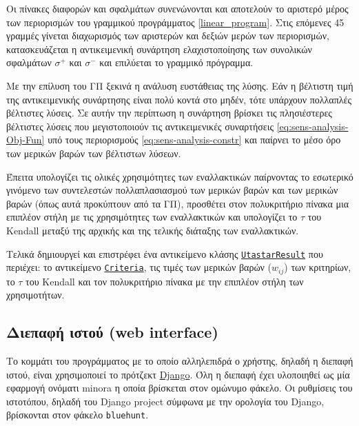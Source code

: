 \documentclass[11pt,a4paper,titlepage]{article}
\numberwithin{equation}{section}
\begin{document}
Οι πίνακες διαφορών και σφαλμάτων συνενώνονται και αποτελούν το αριστερό μέρος των περιορισμών του γραμμικού προγράμματος \eqref{linear_program}. Στις επόμενες 45 γραμμές γίνεται διαχωρισμός των αριστερών και δεξιών μερών των περιορισμών, κατασκευάζεται η αντικειμενική συνάρτηση ελαχιστοποίησης των συνολικών σφαλμάτων $ σ^{+} $ και $ σ^{-} $ και επιλύεται το γραμμικό πρόγραμμα.

Με την επίλυση του ΓΠ ξεκινά η ανάλυση ευστάθειας της λύσης. Εάν η βέλτιστη τιμή της αντικειμενικής συνάρτησης είναι πολύ κοντά στο μηδέν, τότε υπάρχουν πολλαπλές βέλτιστες λύσεις. Σε αυτήν την περίπτωση η συνάρτηση βρίσκει τις πλησιέστερες βέλτιστες λύσεις που μεγιστοποιούν τις αντικειμενικές συναρτήσεις \eqref{eq:sens-analysis-Obj-Fun} υπό τους περιορισμούς \eqref{eq:sens-analysis-constr} και παίρνει το μέσο όρο των μερικών βαρών των βέλτιστων λύσεων. 

Έπειτα υπολογίζει τις ολικές χρησιμότητες των εναλλακτικών παίρνοντας το εσωτερικό γινόμενο των συντελεστών πολλαπλασιασμού των μερικών βαρών και των μερικών βαρών (όπως αυτά προκύπτουν από τα ΓΠ), προσθέτει στον πολυκριτήριο πίνακα μια επιπλέον στήλη με τις χρησιμότητες των εναλλακτικών και υπολογίζει το $ \tau $
του Kendall μεταξύ της αρχικής και της τελικής διάταξης των εναλλακτικών.

Τελικά δημιουργεί και επιστρέφει ένα αντικείμενο κλάσης \hyperref[sssec:UtastarResult]{\texttt{UtastarResult}}
που περιέχει: το αντικείμενο \hyperref[sssec:Criteria]{\texttt{Criteria}}, τις τιμές των μερικών βαρών ($ w_{ij} $)
των κριτηρίων, το $ \tau $ του Kendall και τον πολυκριτήριο πίνακα με την επιπλέον στήλη των χρησιμοτήτων.


\subsection{Διεπαφή ιστού (web interface)}
\label{ssec:web-interface}
Το κομμάτι του προγράμματος με το οποίο αλληλεπιδρά ο χρήστης, δηλαδή η διεπαφή ιστού, είναι χρησιμοποιεί το πρότζεκτ \href{https://www.djangoproject.com/}{Django}. Όλη η διεπαφή έχει υλοποιηθεί ως μία εφαρμογή ονόματι minora η οποία βρίσκεται στον ομώνυμο φάκελο. Οι ρυθμίσεις του ιστοτόπου, δηλαδή του Django project σύμφωνα με την ορολογία του Django, βρίσκονται στον φάκελο \texttt{bluehunt}.
\end{document}

